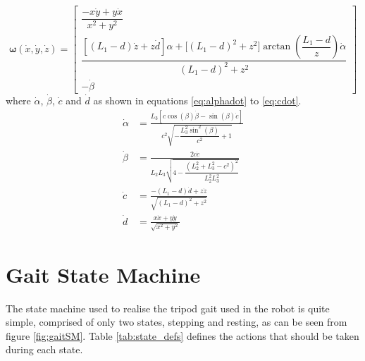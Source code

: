             \begin{equation}\label{eq:rate}
                \bm{\omega}(\dot{x}, \dot{y}, \dot{z}) =
                                    \begin{bmatrix}
                                        \dfrac{- x\dot{y} + y \dot{x}}{x^2 + y^2}\\[0.5cm]
                                        \dfrac{\left[(L_1 - d)\dot{z} + z\dot{d}\right]\alpha + \Big[(L_1 - d)^2 + z^2\Big]\arctan{\left(\dfrac{L_1-d}{z}\right)}\dot{\alpha}}{(L_1 - d)^2 + z^2}\\[0.8cm]
                                        -\dot{\beta} 
                                    \end{bmatrix}
            \end{equation}
            where \(\dot\alpha\), \(\dot\beta\), \(\dot{c}\) and \(\dot{d}\) as shown in equations \ref{eq:alphadot} to \ref{eq:cdot}.
            \begin{align}
                \dot{\alpha} &= \frac{ L_3\left[ c\cos(\beta)\dot{\beta} - \sin(\beta)\dot{c} \right] }{ c^2\sqrt{-\dfrac{L_3^2\sin^2(\beta)}{c^2}+1} } \label{eq:alphadot} \\[0.5cm] 
                \dot{\beta} &= \frac{ 2c\dot{c} }{ L_2L_3\sqrt{4 - \dfrac{(L_2^2+L_3^2-c^2)^2}{L_2^2L_3^2}} } \label{eq:betadot} \\[0.5cm]
                \dot{c} &= \frac{-(L_1 - d)\dot{d} + z\dot{z}}{\sqrt{(L_1 - d)^2 + z^2}} \label{eq:bdot} \\[0.5cm]
                \dot{d} &= \frac{x\dot{x} + y\dot{y}}{\sqrt{x^2 + y^2}} \label{eq:cdot}
            \end{align}
    
    \newpage
    \section{Gait State Machine}
        The state machine used to realise the tripod gait used in the robot is quite simple, comprised of only two states, stepping and
        resting, as can be seen from figure \ref{fig:gaitSM}. Table \ref{tab:state_defs} defines the actions that should be taken during
        each state.

